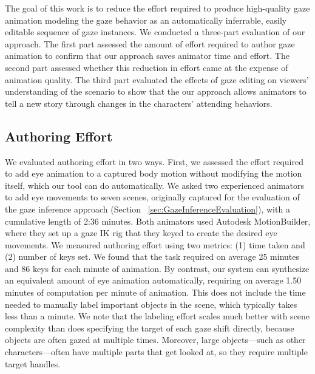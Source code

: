 The goal of this work is to reduce the effort required to produce high-quality gaze animation modeling the gaze behavior as an automatically inferrable, easily editable sequence of gaze instances.
We conducted a three-part evaluation of our approach. The first part assessed the amount of effort required to author gaze animation to confirm that our approach saves animator time and effort. The second part assessed whether this reduction in effort came at the expense of animation quality. The third part evaluated the effects of gaze editing on viewers' understanding of the scenario to show that the our approach allows animators to tell a new story through changes in the characters' attending behaviors.

\subsection{Authoring Effort}
\label{sec:GazeAuthoringEffortEvaluation}

We evaluated authoring effort in two ways. First, we assessed the effort required to add eye animation to a captured body motion without modifying the motion itself, which our tool can do automatically. We asked two experienced animators to add eye movements to seven scenes, originally captured for the evaluation of the gaze inference approach (Section ~\ref{sec:GazeInferenceEvaluation}), with a cumulative length of 2:36 minutes. Both animators used Autodesk MotionBuilder, where they set up a gaze IK rig that they keyed to create the desired eye movements. We measured authoring effort using two metrics: (1) time taken and (2) number of keys set. We found that the task required on average 25 minutes and 86 keys for each minute of animation. By contrast, our system can synthesize an equivalent amount of eye animation automatically, requiring on average 1.50 minutes of computation per minute of animation. This does not include the time needed to manually label important objects in the scene, which typically takes less than a minute.
We note that the labeling effort scales much better with scene complexity than does specifying the target of each gaze shift directly, because objects are often gazed at multiple times. Moreover, large objects---such as other characters---often have multiple parts that get looked at, so they require multiple target handles.

